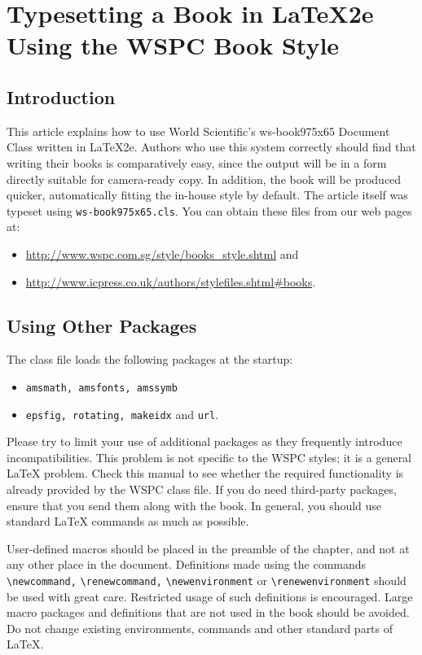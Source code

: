 \chapter[Typesetting a Book in \LaTeX2e Using the WSPC Book Style]{Typesetting a Book in \LaTeX2e\\ Using the WSPC Book Style\label{ch1}}

\section{Introduction}\label{sec1.1}
This article explains how to use World Scientific's ws-book975x65
Document Class written in \LaTeX2e. Authors who use this system
correctly should find that writing their books is comparatively
easy, since the output will be in a form directly suitable for
camera-ready copy. In addition, the book will be produced quicker,
automatically fitting the in-house style by default. The article
itself was typeset using \verb|ws-book975x65.cls|. You can obtain
these files from our web pages at:
\begin{itemize}
\item \url{http://www.wspc.com.sg/style/books_style.shtml} and
\item \url{http://www.icpress.co.uk/authors/stylefiles.shtml#books}.
\end{itemize}

\section{Using Other Packages}\label{sec1.2}
The class file loads the following packages at the startup:

\begin{itemize}
\item \verb|amsmath, amsfonts, amssymb|
\item \verb|epsfig, rotating, makeidx| and \verb|url|.
\end{itemize}

Please try to limit your use of additional packages
as they frequently introduce incompatibilities. This problem is not
specific to the WSPC styles; it is a general \LaTeX{} problem. Check
this manual to see whether the required functionality is already
provided by the WSPC class file. If you do need third-party
packages, ensure that you send them along with the book. In general,
you should use standard \LaTeX{} commands as much as possible.

User-defined macros should be placed in the preamble of the chapter,
and not at any other place in the document. Definitions made using
the commands \verb|\newcommand,| \verb|\renewcommand,|
\verb|\newenvironment| or \verb|\renewenvironment| should be used
with great care. Restricted usage of such definitions is encouraged.
Large macro packages and definitions that are not used in the book
should be avoided. Do not change existing environments, commands and
other standard parts of \LaTeX.

